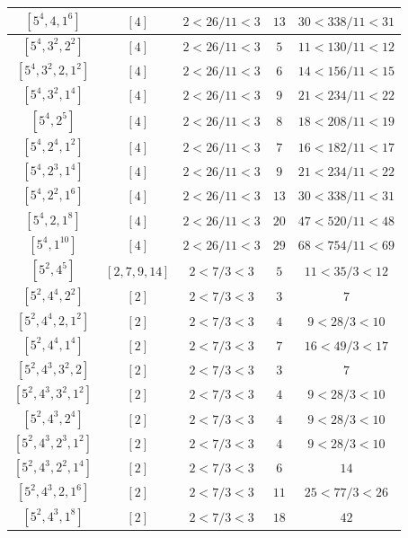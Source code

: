 \documentclass{article}%
\begin{document}
\begin{center}
\begin{longtable}{||c|c|c|c|c||}
$[5^{4}, 4, 1^{6}]$ & $[4]$ & $2 < 26/11 < 3$ & $13$ & $30 < 338/11 < 31$ \\ \hline 
$[5^{4}, 3^{2}, 2^{2}]$ & $[4]$ & $2 < 26/11 < 3$ & $5$ & $11 < 130/11 < 12$ \\ \hline 
$[5^{4}, 3^{2}, 2, 1^{2}]$ & $[4]$ & $2 < 26/11 < 3$ & $6$ & $14 < 156/11 < 15$ \\ \hline 
$[5^{4}, 3^{2}, 1^{4}]$ & $[4]$ & $2 < 26/11 < 3$ & $9$ & $21 < 234/11 < 22$ \\ \hline 
$[5^{4}, 2^{5}]$ & $[4]$ & $2 < 26/11 < 3$ & $8$ & $18 < 208/11 < 19$ \\ \hline 
$[5^{4}, 2^{4}, 1^{2}]$ & $[4]$ & $2 < 26/11 < 3$ & $7$ & $16 < 182/11 < 17$ \\ \hline 
$[5^{4}, 2^{3}, 1^{4}]$ & $[4]$ & $2 < 26/11 < 3$ & $9$ & $21 < 234/11 < 22$ \\ \hline 
$[5^{4}, 2^{2}, 1^{6}]$ & $[4]$ & $2 < 26/11 < 3$ & $13$ & $30 < 338/11 < 31$ \\ \hline 
$[5^{4}, 2, 1^{8}]$ & $[4]$ & $2 < 26/11 < 3$ & $20$ & $47 < 520/11 < 48$ \\ \hline 
$[5^{4}, 1^{10}]$ & $[4]$ & $2 < 26/11 < 3$ & $29$ & $68 < 754/11 < 69$ \\ \hline 
$[5^{2}, 4^{5}]$ & $[2, 7, 9, 14]$ & $2 < 7/3 < 3$ & $5$ & $11 < 35/3 < 12$ \\ \hline 
$[5^{2}, 4^{4}, 2^{2}]$ & $[2]$ & $2 < 7/3 < 3$ & $3$ & $7$ \\ \hline 
$[5^{2}, 4^{4}, 2, 1^{2}]$ & $[2]$ & $2 < 7/3 < 3$ & $4$ & $9 < 28/3 < 10$ \\ \hline 
$[5^{2}, 4^{4}, 1^{4}]$ & $[2]$ & $2 < 7/3 < 3$ & $7$ & $16 < 49/3 < 17$ \\ \hline 
$[5^{2}, 4^{3}, 3^{2}, 2]$ & $[2]$ & $2 < 7/3 < 3$ & $3$ & $7$ \\ \hline 
$[5^{2}, 4^{3}, 3^{2}, 1^{2}]$ & $[2]$ & $2 < 7/3 < 3$ & $4$ & $9 < 28/3 < 10$ \\ \hline 
$[5^{2}, 4^{3}, 2^{4}]$ & $[2]$ & $2 < 7/3 < 3$ & $4$ & $9 < 28/3 < 10$ \\ \hline 
$[5^{2}, 4^{3}, 2^{3}, 1^{2}]$ & $[2]$ & $2 < 7/3 < 3$ & $4$ & $9 < 28/3 < 10$ \\ \hline 
$[5^{2}, 4^{3}, 2^{2}, 1^{4}]$ & $[2]$ & $2 < 7/3 < 3$ & $6$ & $14$ \\ \hline 
$[5^{2}, 4^{3}, 2, 1^{6}]$ & $[2]$ & $2 < 7/3 < 3$ & $11$ & $25 < 77/3 < 26$ \\ \hline 
$[5^{2}, 4^{3}, 1^{8}]$ & $[2]$ & $2 < 7/3 < 3$ & $18$ & $42$ \\ \hline 

\end{longtable}
\end{center}
\end{document}

